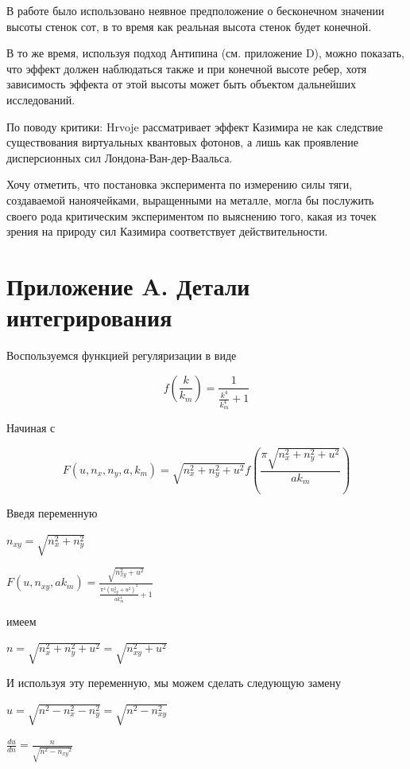 \documentclass[11pt]{article}
\begin{document}
    В работе было использовано неявное предположение о бесконечном значении
высоты стенок сот, в то время как реальная высота стенок будет конечной.

    В то же время, используя подход Антипина (см. приложение D), можно
показать, что эффект должен наблюдаться также и при конечной высоте
ребер, хотя зависимость эффекта от этой высоты может быть объектом
дальнейших исследований.

    По поводу критики: Hrvoje \cite{Hrvoje2016} рассматривает эффект
Казимира не как следствие существования виртуальных квантовых фотонов, а
лишь как проявление дисперсионных сил Лондона-Ван-дер-Ваальса.

    Хочу отметить, что постановка эксперимента по измерению силы тяги,
создаваемой наноячейками, выращенными на металле, могла бы послужить
своего рода критическим экспериментом по выяснению того, какая из точек
зрения на природу сил Казимира соответствует действительности.

    \section{Приложение A. Детали интегрирования}\label{ux43fux440ux438ux43bux43eux436ux435ux43dux438ux435-a.-ux434ux435ux442ux430ux43bux438-ux438ux43dux442ux435ux433ux440ux438ux440ux43eux432ux430ux43dux438ux44f}

    Воспользуемся функцией регуляризации в виде

    \[f\left(\frac{k}{k_m}\right) = \frac{1}{\frac{k^{4}}{k_{m}^{4}} + 1}\]

    Начиная с

    \[F\left(u, n_x, n_y, a, k_m\right) = \sqrt{n_{x}^{2} + n_{y}^{2} + u^{2}} f\left(\frac{\pi \sqrt{n_{x}^{2} + n_{y}^{2} + u^{2}}}{a k_{m}}\right)\]

    Введя переменную

\(n_{xy} = \sqrt{n_x^2 + n_y^2}\)

    \(F\left(u, n_{xy}, ak_m\right) = \frac{\sqrt{n_{\mathit{xy}}^{2} + u^{2}}}{\frac{\pi^{4} {\left(n_{\mathit{xy}}^{2} + u^{2}\right)}^{2}}{\mathit{ak}_{m}^{4}} + 1}\)

    имеем

\(n = \sqrt{n_x^2 + n_y^2 + u^2} = \sqrt{n_{xy}^2 + u^2}\)

И используя эту переменную, мы можем сделать следующую замену

\(u = \sqrt{n^2 - n_x^2 - n_y^2} = \sqrt{n^2 - n_{xy}^2}\)

\(\frac{du}{dn} = \frac{n}{\sqrt{n^{2} - \mathit{n_{xy}}^{2}}}\)
\end{document}
